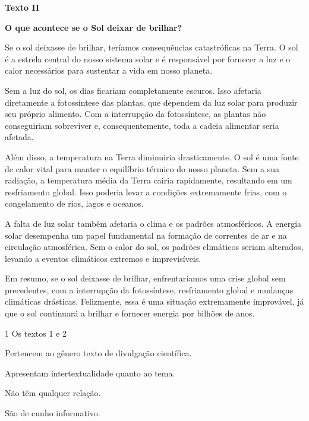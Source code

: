 \begin{myquote}
\begin{center}
\textbf{Texto II}

\textbf{O que acontece se o Sol deixar de brilhar?}
\end{center}

\noindent Se o sol deixasse de brilhar, teríamos consequências catastróficas na
Terra. O sol é a estrela central do nosso sistema solar e é responsável
por fornecer a luz e o calor necessários para sustentar a vida em nosso
planeta.

Sem a luz do sol, os dias ficariam completamente escuros. Isso afetaria
diretamente a fotossíntese das plantas, que dependem da luz solar para
produzir seu próprio alimento. Com a interrupção da fotossíntese, as
plantas não conseguiriam sobreviver e, consequentemente, toda a cadeia
alimentar seria afetada.

Além disso, a temperatura na Terra diminuiria drasticamente. O sol é uma
fonte de calor vital para manter o equilíbrio térmico do nosso planeta.
Sem a sua radiação, a temperatura média da Terra cairia rapidamente,
resultando em um resfriamento global. Isso poderia levar a condições
extremamente frias, com o congelamento de rios, lagos e oceanos.

A falta de luz solar também afetaria o clima e os padrões atmosféricos.
A energia solar desempenha um papel fundamental na formação de correntes
de ar e na circulação atmosférica. Sem o calor do sol, os padrões
climáticos seriam alterados, levando a eventos climáticos extremos e
imprevisíveis.

Em resumo, se o sol deixasse de brilhar, enfrentaríamos uma crise global
sem precedentes, com a interrupção da fotossíntese, resfriamento global
e mudanças climáticas drásticas. Felizmente, essa é uma situação
extremamente improvável, já que o sol continuará a brilhar e fornecer
energia por bilhões de anos.

\end{myquote}

\num{1} Os textos 1 e 2

\begin{escolha}
\item Pertencem ao gênero texto de divulgação científica.
\item Apresentam intertextualidade quanto ao tema. 
\item Não têm qualquer relação.
\item São de cunho informativo.
\end{escolha}

